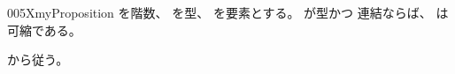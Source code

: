 \documentclass[index]{subfiles}
\begin{document}
\begin{myBlock}{005X}{myProposition}
  を階数、
  を型、
  を要素とする。
  が型かつ
  連結ならば、
  は可縮である。
\end{myBlock}
\begin{myProof}
  から従う。
\end{myProof}
\end{document}
